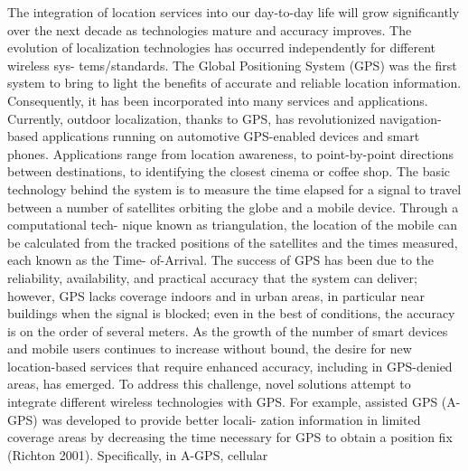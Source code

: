 The integration of location services into our day-to-day life will grow significantly
over the next decade as technologies mature and accuracy improves. The evolution
of localization technologies has occurred independently for different wireless sys-
tems/standards. The Global Positioning System (GPS) was the first system to bring
to light the benefits of accurate and reliable location information. Consequently, it
has been incorporated into many services and applications. Currently, outdoor
localization, thanks to GPS, has revolutionized navigation-based applications
running on automotive GPS-enabled devices and smart phones. Applications range
from location awareness, to point-by-point directions between destinations, to
identifying the closest cinema or coffee shop. The basic technology behind the
system is to measure the time elapsed for a signal to travel between a number of
satellites orbiting the globe and a mobile device. Through a computational tech-
nique known as triangulation, the location of the mobile can be calculated from the
tracked positions of the satellites and the times measured, each known as the Time-
of-Arrival. The success of GPS has been due to the reliability, availability, and
practical accuracy that the system can deliver; however, GPS lacks coverage
indoors and in urban areas, in particular near buildings when the signal is blocked;
even in the best of conditions, the accuracy is on the order of several meters.
As the growth of the number of smart devices and mobile users continues to
increase without bound, the desire for new location-based services that require
enhanced accuracy, including in GPS-denied areas, has emerged. To address this
challenge, novel solutions attempt to integrate different wireless technologies with
GPS. For example, assisted GPS (A-GPS) was developed to provide better locali-
zation information in limited coverage areas by decreasing the time necessary for
GPS to obtain a position fix (Richton 2001). Specifically, in A-GPS, cellular

